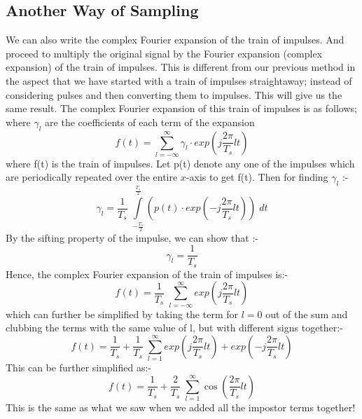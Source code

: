 \subsection {Another Way of Sampling}
We can also write the complex Fourier expansion of the train of impulses. And proceed to multiply the original signal by the Fourier expansion (complex expansion) of the train of impulses. This is different from our previous method in the aspect that we have started with a train of impulses straightaway; instead of considering pulses and then converting them to impulses. This will give us the same result.
\newline
The complex Fourier expansion of this train of impulses is as follows; where $\gamma _{l}$ are the coefficients of each term of the expansion
\[
f(t)=\sum_{l=-\infty}^{\infty} \gamma_{l} \cdot exp(j \frac{2\pi}{T_{s}}lt)
\]
where f(t) is the train of impulses.
\newline
Let p(t) denote any one of the impulses which are periodically repeated over the entire $x$-axis to get f(t). Then for finding $\gamma_{l}$  :-
\[
\gamma_{l}= \frac{1}{T_{s}}\;\int \limits_{-\frac{T_{s}}{2}}^{\frac{T_{s}}{2}} \left( p(t)\cdot exp(-j \frac{2\pi}{T_{s}}lt) \right)  \; dt
\]
By the sifting property of the impulse, we can show that :-
\[
\gamma_{l}=\frac{1}{T_{s}}
\]
Hence, the complex Fourier expansion of the train of impulses is:-
\[
f(t)=\frac{1}{T_{s}}\;\sum_{l=-\infty}^{\infty} exp(j \frac{2\pi}{T_{s}}lt)
\]
which can further be simplified by taking the term for $l=0$ out of the sum and clubbing the terms with the same value of l, but with different signs together:-
\[
f(t)=\frac{1}{T_{s}}+\frac{1}{T_{s}}\;\sum_{l=1}^{\infty} exp(j \frac{2\pi}{T_{s}}lt) + exp(-j \frac{2\pi}{T_{s}}lt)
\]
This can be further simplified as:-
\[
f(t)=\frac{1}{T_{s}}+\frac{2}{T_{s}}\;\sum_{l=1}^{\infty} \cos (\frac{2\pi}{T_{s}}lt)
\]
This is the same as what we saw when we added all the impostor terms together!
